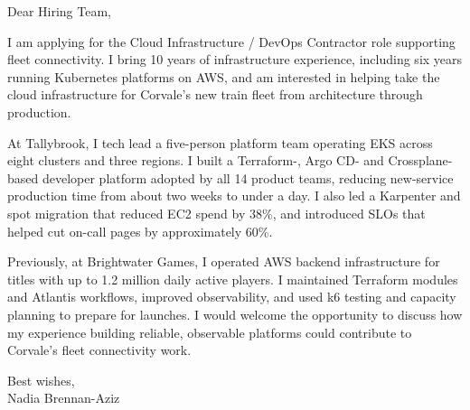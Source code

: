 \documentclass[11pt,a4paper]{article}
\begin{document}
Dear Hiring Team,

I am applying for the Cloud Infrastructure / DevOps Contractor role supporting fleet connectivity. I bring 10 years of infrastructure experience, including six years running Kubernetes platforms on AWS, and am interested in helping take the cloud infrastructure for Corvale's new train fleet from architecture through production.

At Tallybrook, I tech lead a five-person platform team operating EKS across eight clusters and three regions. I built a Terraform-, Argo CD- and Crossplane-based developer platform adopted by all 14 product teams, reducing new-service production time from about two weeks to under a day. I also led a Karpenter and spot migration that reduced EC2 spend by 38\%, and introduced SLOs that helped cut on-call pages by approximately 60\%.

Previously, at Brightwater Games, I operated AWS backend infrastructure for titles with up to 1.2 million daily active players. I maintained Terraform modules and Atlantis workflows, improved observability, and used k6 testing and capacity planning to prepare for launches. I would welcome the opportunity to discuss how my experience building reliable, observable platforms could contribute to Corvale's fleet connectivity work.

Best wishes,\\
Nadia Brennan-Aziz
\end{document}
